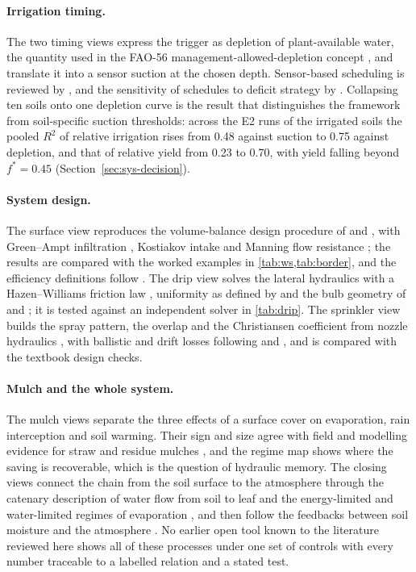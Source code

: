 \paragraph{Irrigation timing.} The two timing views express the trigger as depletion of plant-available water, the quantity used in the FAO-56 management-allowed-depletion concept \citep{Allen1998}, and translate it into a sensor suction at the chosen depth. Sensor-based scheduling is reviewed by \citet{Datta2023}, and the sensitivity of schedules to deficit strategy by \citet{Fereres2007}. Collapsing ten soils onto one depletion curve is the result that distinguishes the framework from soil-specific suction thresholds: across the E2 runs of the irrigated soils the pooled $R^2$ of relative irrigation rises from 0.48 against suction to 0.75 against depletion, and that of relative yield from 0.23 to 0.70, with yield falling beyond $f^\ast=0.45$ (Section~\ref{sec:sys-decision}).

\paragraph{System design.} The surface view reproduces the volume-balance design procedure of \citet{Walker1989} and \citet{Elliott1982}, with Green--Ampt infiltration \citep{GreenAmpt1911}, Kostiakov intake \citep{Kostiakov1932} and Manning flow resistance \citep{Manning1891}; the results are compared with the worked examples in \cref{tab:ws,tab:border}, and the efficiency definitions follow \citet{Burt1997}. The drip view solves the lateral hydraulics with a Hazen--Williams friction law \citep{Hazen1905}, uniformity as defined by \citet{KellerKarmeli1974} and the bulb geometry of \citet{Warrick1988} and \citet{Schwartzman1986}; it is tested against an independent solver in \cref{tab:drip}. The sprinkler view builds the spray pattern, the overlap and the Christiansen coefficient \citep{Christiansen1942} from nozzle hydraulics \citep{Keller1990}, with ballistic and drift losses following \citet{Playan2005} and \citet{Dechmi2003}, and is compared with the textbook design checks.

\paragraph{Mulch and the whole system.} The mulch views separate the three effects of a surface cover on evaporation, rain interception and soil warming. Their sign and size agree with field and modelling evidence for straw and residue mulches \citep{BalwinderSingh2011,Zheng2021,Vuaille2024,Kang2024}, and the regime map shows where the saving is recoverable, which is the question of hydraulic memory. The closing views connect the chain from the soil surface to the atmosphere through the catenary description of water flow from soil to leaf \citep{vandenHonert1948,Nobel2009} and the energy-limited and water-limited regimes of evaporation \citep{Roderick2002,Seneviratne2010}, and then follow the feedbacks between soil moisture and the atmosphere \citep{Entekhabi1996,Koster2004}. No earlier open tool known to the literature reviewed here shows all of these processes under one set of controls with every number traceable to a labelled relation and a stated test.

